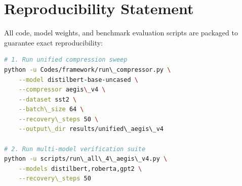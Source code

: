 \section{Reproducibility Statement}
All code, model weights, and benchmark evaluation scripts are packaged to guarantee exact reproducibility:
\begin{lstlisting}[language=bash]
# 1. Run unified compression sweep
python -u Codes/framework/run\_compressor.py \
    --model distilbert-base-uncased \
    --compressor aegis\_v4 \
    --dataset sst2 \
    --batch\_size 64 \
    --recovery\_steps 50 \
    --output\_dir results/unified\_aegis\_v4

# 2. Run multi-model verification suite
python -u scripts/run\_all\_4\_aegis\_v4.py \
    --models distilbert,roberta,gpt2 \
    --recovery\_steps 50
\end{lstlisting}
